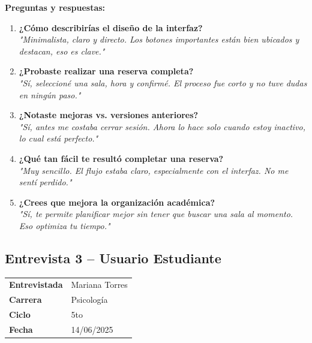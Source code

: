 \documentclass{article}
\begin{document}
\textbf{Preguntas y respuestas:}
\begin{enumerate}
    \item \textbf{¿Cómo describirías el diseño de la interfaz?} \\ 
    \textit{"Minimalista, claro y directo. Los botones importantes están bien ubicados y destacan, eso es clave."}
    
    \item \textbf{¿Probaste realizar una reserva completa?} \\ 
    \textit{"Sí, seleccioné una sala, hora y confirmé. El proceso fue corto y no tuve dudas en ningún paso."}
    
    \item \textbf{¿Notaste mejoras vs. versiones anteriores?} \\ 
    \textit{"Sí, antes me costaba cerrar sesión. Ahora lo hace solo cuando estoy inactivo, lo cual está perfecto."}
    
    \item \textbf{¿Qué tan fácil te resultó completar una reserva?} \\ 
    \textit{"Muy sencillo. El flujo estaba claro, especialmente con el interfaz. No me sentí perdido."}
    
    \item \textbf{¿Crees que mejora la organización académica?} \\ 
    \textit{"Sí, te permite planificar mejor sin tener que buscar una sala al momento. Eso optimiza tu tiempo."}
\end{enumerate}
\newpage
\subsection{Entrevista 3 – Usuario Estudiante}
\begin{table}[h]
\centering
\begin{tabular}{|l|l|}
\hline
\textbf{Entrevistada} & Mariana Torres \\ 
\textbf{Carrera} & Psicología \\ 
\textbf{Ciclo} & 5to \\ 
\textbf{Fecha} & 14/06/2025 \\ 
\hline
\end{tabular}
\end{table}
\end{document}
